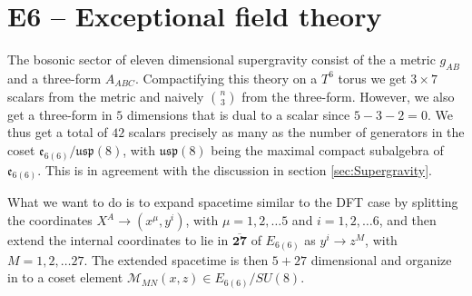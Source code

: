 \section{E6 -- Exceptional field theory \label{sec:E6}}
The bosonic sector of eleven dimensional supergravity consist of the a metric $g_{AB}$ and a three-form $A_{ABC}$. Compactifying this theory on a $T^6$ torus we get $3\times 7$ scalars from the metric and naively ${n}\choose{3}$ from the three-form. However, we also get a three-form in $5$ dimensions that is dual to a scalar since $5-3-2=0$. We thus get a total of $42$ scalars precisely as many as the number of generators in the coset $\mathfrak{e}_{6(6)}/\mathfrak{usp}(8)$, with $\mathfrak{usp}(8)$ being the maximal compact subalgebra of $\mathfrak{e}_{6(6)}$. This is in agreement with the discussion in section \ref{sec:Supergravity}. 

What we want to do is to expand spacetime similar to the DFT case by splitting the coordinates $X^A\to (x^\mu,y^i)$, with $\mu=1,2,\ldots 5$ and $i = 1,2,\ldots 6$, and then extend the internal coordinates to lie in $\overbar{\mathbf{27}}$ of $E_{6(6)}$ as $y^i\to z^M$, with $M=1,2,\ldots 27$. The extended spacetime is then $5+27$ dimensional and organize in to a coset element $\mathcal{M}_{MN}(x,z)\in E_{6(6)}/SU(8)$. 

